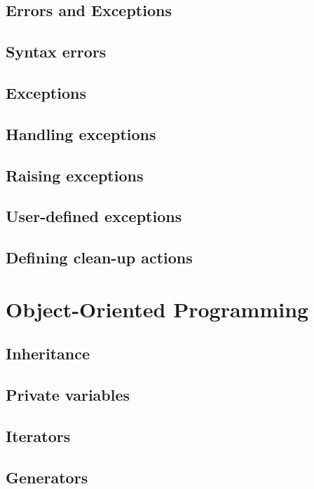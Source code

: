 \documentclass[article,A4,12pt]{llncs}
\begin{document}
\subsection{Errors and Exceptions}


\subsection{Syntax errors}


\subsection{Exceptions}


\subsection{Handling exceptions}


\subsection{Raising exceptions}


\subsection{User-defined exceptions}


\subsection{Defining clean-up actions}


\section{Object-Oriented Programming} \label{sec:obj}


\subsection{Inheritance}


\subsection{Private variables}


\subsection{Iterators}


\subsection{Generators}
\end{document}
